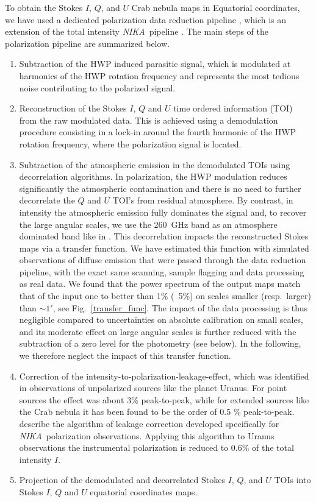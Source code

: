 \documentclass[twocolumn,traditabstract]{aa}
\def\NIKA{\textit{NIKA}}
\begin{document}
To obtain the Stokes $I$, $Q$, and $U$ Crab nebula maps in Equatorial coordinates, we have used a dedicated
polarization data reduction pipeline \citep{ritacco2017}, which is an extension
of the total intensity \NIKA\ pipeline \citep{catalano2014,adam2013}. The main steps
of the polarization pipeline are summarized below.
\begin{enumerate}
\item Subtraction of the HWP induced parasitic signal, which is modulated at harmonics of the HWP rotation frequency and represents the most tedious noise contributing to the polarized signal. 
\item Reconstruction of the Stokes $I$, $Q$ and $U$ time ordered information
  (TOI) from the raw modulated data. This is achieved using a demodulation
  procedure consisting in a lock-in around the fourth harmonic of the HWP rotation frequency, where the polarization signal is located.
\item Subtraction of the atmospheric emission in the demodulated TOIs using
  decorrelation algorithms. In polarization, the HWP modulation reduces
  significantly the atmospheric contamination and there is no need to
  further decorrelate the $Q$ and $U$ TOI's from residual atmosphere. By contrast, in
  intensity the atmospheric emission fully dominates the signal and, to recover
  the large angular scales, we use the 260~GHz band as an atmosphere
  dominated band like in \cite{adam2013}.  This decorrelation impacts the
  reconstructed Stokes maps via a transfer function. We have estimated this function
  with simulated observations of diffuse emission that were passed through the
  data reduction pipeline, with the exact same scanning, sample flagging and data
  processing as real data. We found that the power spectrum of the output maps
  match that of the input one to better than 1\% (~5\%) on scales smaller
  (resp.~larger) than $\sim 1'$, see Fig.~\ref{transfer_func}. The impact of the data processing is thus
  negligible compared to uncertainties on absolute calibration on small
  scales, and its moderate effect on large angular scales is further reduced
  with the subtraction of a zero level for the photometry (see below). In the
  following, we therefore neglect the impact of this transfer function.


\item Correction of the intensity-to-polarization-leakage-effect, which was
  identified in observations of unpolarized sources like the planet Uranus. For
  point sources the effect was about 3\% peak-to-peak, while for extended sources like the Crab nebula it has been found to be the order of 0.5 \% peak-to-peak. 
  \cite{ritacco2017} describe the algorithm of leakage correction developed specifically for \NIKA\ polarization observations. Applying this algorithm to Uranus observations the instrumental polarization is reduced to 0.6\% of the total intensity $I$.
  \item Projection of the demodulated and decorrelated Stokes $I$, $Q$, and $U$ TOIs into Stokes $I$, $Q$ and $U$ equatorial coordinates maps.

\end{enumerate}
\end{document}
